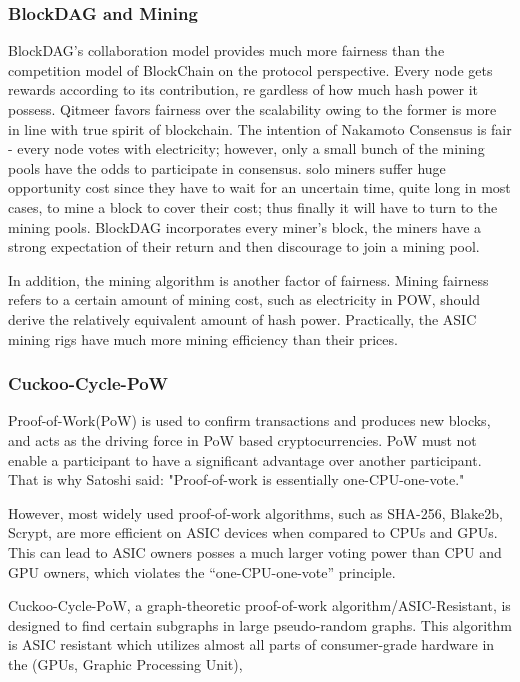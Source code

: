 \documentclass[a4paper,11pt]{article}
\begin{document}
\subsubsection{BlockDAG and Mining}
BlockDAG’s collaboration model provides much more fairness than the competition model of BlockChain on the protocol perspective. Every node gets rewards according to its contribution, re gardless of how much hash power it possess. Qitmeer favors fairness over the scalability owing to the former is more in line with true spirit of blockchain. The intention of Nakamoto Consensus is fair - every node votes with electricity; however, only a small bunch of the mining pools have the odds to participate in consensus. solo miners suffer huge opportunity cost since they have to wait for an uncertain time, quite long in most cases, to mine a block to cover their cost; thus finally it will have to turn to the mining pools. BlockDAG incorporates every miner’s block, the miners have a strong expectation of their return and then discourage to join a mining pool.


In addition, the mining algorithm is  another factor of fairness. Mining fairness refers to a certain amount of mining cost, such as electricity in POW, should derive the relatively equivalent amount of hash power. Practically, the ASIC mining rigs have much more mining efficiency than their prices.

\subsubsection{Cuckoo-Cycle-PoW}
Proof-of-Work(PoW) is used to confirm transactions and produces new blocks, and acts as the driving force in PoW based cryptocurrencies. PoW must not enable a participant to have a significant advantage over another participant. That is why Satoshi said: "Proof-of-work is essentially one-CPU-one-vote."

However, most widely used proof-of-work algorithms, such as SHA-256, Blake2b, Scrypt, are more efficient on ASIC devices when compared to CPUs and GPUs. This can lead to ASIC owners posses a much larger voting power than CPU and GPU owners, which violates the “one-CPU-one-vote” principle.

Cuckoo-Cycle-PoW, a graph-theoretic proof-of-work algorithm/ASIC-Resistant, is designed to find certain subgraphs in large pseudo-random graphs. This algorithm is ASIC resistant which  utilizes almost all parts of consumer-grade hardware in the  (GPUs, Graphic Processing Unit),
\end{document}
